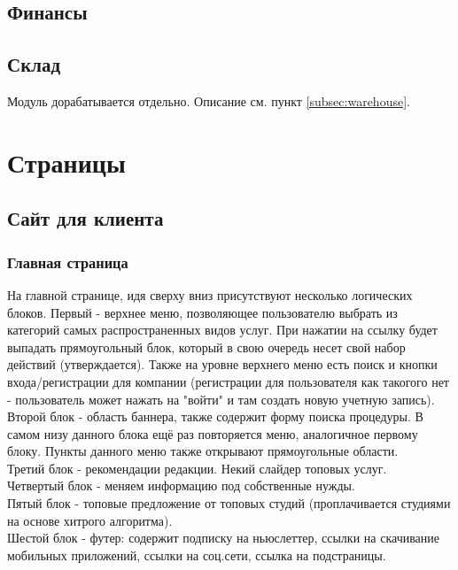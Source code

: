 \documentclass[DIV=calc, paper=a4, fontsize=11pt]{scrartcl} %
\begin{document}
\subsection{Финансы}

\subsection{Склад}
Модуль дорабатывается отдельно. Описание см. пункт \ref{subsec:warehouse}.

\section{Страницы}

\subsection{Сайт для клиента}

\subsubsection{Главная страница}

На главной странице, идя сверху вниз присутствуют несколько логических блоков. Первый - верхнее меню, позволяющее пользователю выбрать из категорий самых распространенных видов услуг. При нажатии на ссылку будет выпадать прямоугольный блок, который в свою очередь несет свой набор действий (утверждается). Также на уровне верхнего меню есть поиск и кнопки входа/регистрации для компании (регистрации для пользователя как такогого нет - пользователь может нажать на "войти" и там создать новую учетную запись).
\\Второй блок - область баннера, также содержит форму поиска процедуры. В самом низу данного блока ещё раз повторяется меню, аналогичное первому блоку. Пункты данного меню также открывают прямоугольные области.
\\Третий блок - рекомендации редакции. Некий слайдер топовых услуг.
\\Четвертый блок - меняем информацию под собственные нужды.
\\Пятый блок - топовые предложение от топовых студий (проплачивается студиями на основе хитрого алгоритма).
\\Шестой блок - футер: содержит подписку на ньюслеттер, ссылки на скачивание мобильных приложений, ссылки на соц.сети, ссылка на подстраницы.
\end{document}

